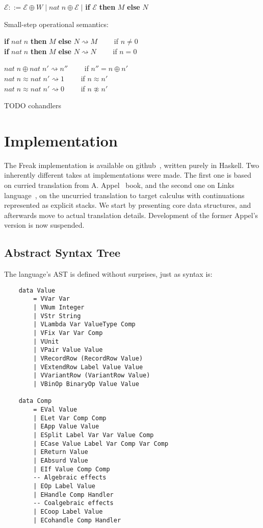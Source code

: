 \documentclass[declaration,shortabstract]{iithesis}
\theoremstyle{definition} \newtheorem{definition}{Definition}[chapter]
\theoremstyle{remark} \newtheorem{remark}[definition]{Observation}
\theoremstyle{plain} \newtheorem{theorem}[definition]{Theorem}
\theoremstyle{plain} \newtheorem{lemma}[definition]{Lemma}
\begin{document}
    \noindent
    $\mathcal{E} ::= \mathcal{E} \oplus W \; | \; nat \; n \oplus \mathcal{E} \; |$ \textbf{if} $\mathcal{E}$ \textbf{then} $M$ \textbf{else} $N$

    \noindent
    Small-step operational semantics:

    \noindent
    \textbf{if} $nat \; n$ \textbf{then} $M$ \textbf{else} $N \rightsquigarrow M \quad \quad $ if $n \neq 0$ \\
    \textbf{if} $nat \; n$ \textbf{then} $M$ \textbf{else} $N \rightsquigarrow N \quad \quad $ if $n = 0$

    \noindent
    $nat \; n \oplus nat \; n' \rightsquigarrow n'' \quad \quad $    if $ n'' = n \oplus n' $ \\
    $nat \; n \approx nat \; n' \rightsquigarrow 1  \quad \quad $    \; if $ n \approx n' $ \\
    $nat \; n \approx nat \; n' \rightsquigarrow 0  \quad \quad $    \; if $ n \not\approx n' $

    TODO cohandlers

\chapter{Implementation}\label{chapter:implementation}

    The Freak implementation is available on github~\cite{freak}, written purely
    in Haskell. Two inherently different takes at implementations were made. The
    first one is based on curried translation from A. Appel~\cite{appel-continuations}
    book, and the second one on Links language~\cite{handlers-cps, handlers-cps-journal},
    on the uncurried translation to target calculus with continuations represented
    as explicit stacks. We start by presenting core data structures, and
    afterwards move to actual translation details. Development of the former
    Appel's version is now suspended.

    \section{Abstract Syntax Tree}\label{sec:implementation-ast}

    The language's AST is defined without surprises, just as syntax is:

\begin{verbatim}
    data Value
        = VVar Var
        | VNum Integer
        | VStr String
        | VLambda Var ValueType Comp
        | VFix Var Var Comp
        | VUnit
        | VPair Value Value
        | VRecordRow (RecordRow Value)
        | VExtendRow Label Value Value
        | VVariantRow (VariantRow Value)
        | VBinOp BinaryOp Value Value

    data Comp
        = EVal Value
        | ELet Var Comp Comp
        | EApp Value Value
        | ESplit Label Var Var Value Comp
        | ECase Value Label Var Comp Var Comp
        | EReturn Value
        | EAbsurd Value
        | EIf Value Comp Comp
        -- Algebraic effects
        | EOp Label Value
        | EHandle Comp Handler
        -- Coalgebraic effects
        | ECoop Label Value
        | ECohandle Comp Handler
\end{verbatim}
\end{document}
